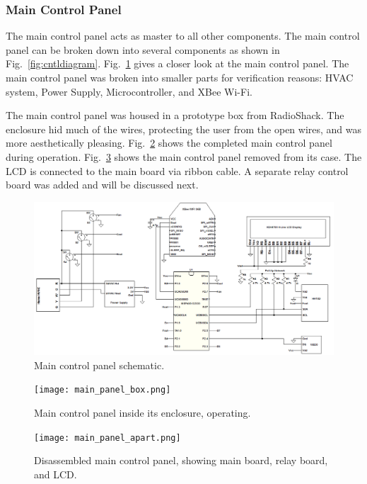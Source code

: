\subsubsection{Main Control Panel}
The main control panel acts as master to all other components. The main control panel can be broken down into several components as shown in Fig.~\ref{fig:cntldiagram}. Fig.~\ref{fig:main_cntl_schematic} gives a closer look at the main control panel.  The main control panel was broken into smaller parts for verification reasons: HVAC system, Power Supply, Microcontroller, and XBee Wi-Fi.

The main control panel was housed in a prototype box from RadioShack.  The enclosure hid much of the wires, protecting the user from the open wires, and was more aesthetically pleasing. Fig.~\ref{fig:main_panel_box} shows the completed main control panel during operation.  Fig.~\ref{fig:main_panel_apart} shows the main control panel removed from its case.  The LCD is connected to the main board via ribbon cable.  A separate relay control board was added and will be discussed next.
\begin{figure}[htbp]
\centering
\includegraphics[width=.99\textwidth]{main_cntl_schematic.png}
\caption{Main control panel schematic.}
\label{fig:main_cntl_schematic}
\end{figure}

\begin{figure}[htbp]
\centering
\texttt{[image: main\_panel\_box.png]}
\caption{Main control panel inside its enclosure, operating.}
\label{fig:main_panel_box}
\end{figure}

\begin{figure}[htbp]
\centering
\texttt{[image: main\_panel\_apart.png]}
\caption{Disassembled main control panel, showing main board, relay board, and LCD.}
\label{fig:main_panel_apart}
\end{figure}

